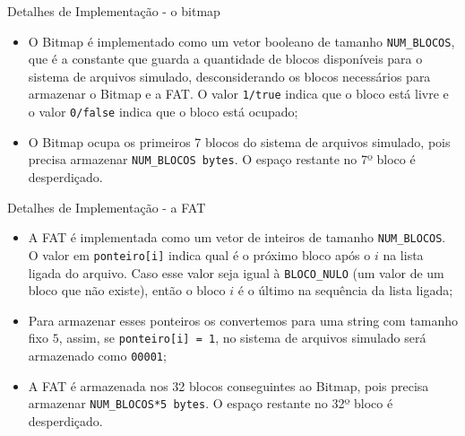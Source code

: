 \documentclass[10pt]{beamer}
\begin{document}
    \begin{frame}{Detalhes de Implementação - o bitmap}
        \begin{itemize}
            \justifying
            \item O Bitmap é implementado como um vetor booleano de tamanho
                \texttt{NUM\_BLOCOS}, que é a constante que guarda a quantidade
                de blocos disponíveis para o sistema de arquivos simulado,
                desconsiderando os blocos necessários para armazenar o Bitmap e
                a FAT. O valor \texttt{1/true} indica que o bloco está livre e o
                valor \texttt{0/false} indica que o bloco está ocupado;
            \item O Bitmap ocupa os primeiros 7 blocos do sistema de arquivos
                simulado, pois precisa armazenar \texttt{NUM\_BLOCOS bytes}. O
                espaço restante no 7º bloco é desperdiçado.
        \end{itemize}
    \end{frame}
    \begin{frame}{Detalhes de Implementação - a FAT}
        \begin{itemize}
            \justifying
            \item A FAT é implementada como um vetor de inteiros de tamanho
                \texttt{NUM\_BLOCOS}. O valor em \texttt{ponteiro[i]} indica
                qual é o próximo bloco após o $i$ na lista ligada do arquivo.
                Caso esse valor seja igual à \texttt{BLOCO\_NULO} (um valor de
                um bloco que não existe), então o bloco $i$ é o último na
                sequência da lista ligada;
            \item Para armazenar esses ponteiros os convertemos para uma string
                com tamanho fixo $5$, assim, se \texttt{ponteiro[i] = 1}, no
                sistema de arquivos simulado será armazenado como
                \texttt{00001};
            \item A FAT é armazenada nos 32 blocos conseguintes ao Bitmap, pois
                precisa armazenar \texttt{NUM\_BLOCOS*5 bytes}. O espaço
                restante no 32º bloco é desperdiçado.
        \end{itemize}
    \end{frame}
\end{document}
